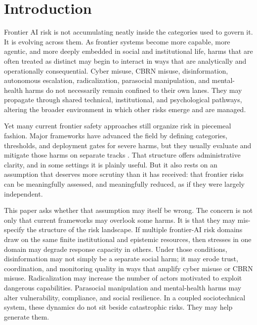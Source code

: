 \documentclass[11pt]{article}
\begin{document}
\section{Introduction}
\label{sec:intro}

Frontier AI risk is not accumulating neatly inside the categories used to govern it. It is evolving across them. As frontier systems become more capable, more agentic, and more deeply embedded in social and institutional life, harms that are often treated as distinct may begin to interact in ways that are analytically and operationally consequential. Cyber misuse, CBRN misuse, disinformation, autonomous escalation, radicalization, parasocial manipulation, and mental-health harms do not necessarily remain confined to their own lanes. They may propagate through shared technical, institutional, and psychological pathways, altering the broader environment in which other risks emerge and are managed.

Yet many current frontier safety approaches still organize risk in piecemeal fashion. Major frameworks have advanced the field by defining categories, thresholds, and deployment gates for severe harms, but they usually evaluate and mitigate those harms on separate tracks \citep{anthropic2024rsp,openai2023preparedness,deepmind2024fsf,nist2023rmf,iaisr2025}. That structure offers administrative clarity, and in some settings it is plainly useful. But it also rests on an assumption that deserves more scrutiny than it has received: that frontier risks can be meaningfully assessed, and meaningfully reduced, as if they were largely independent.

This paper asks whether that assumption may itself be wrong. The concern is not only that current frameworks may overlook some harms. It is that they may mis-specify the structure of the risk landscape. If multiple frontier-AI risk domains draw on the same finite institutional and epistemic resources, then stresses in one domain may degrade response capacity in others. Under those conditions, disinformation may not simply be a separate social harm; it may erode trust, coordination, and monitoring quality in ways that amplify cyber misuse or CBRN misuse. Radicalization may increase the number of actors motivated to exploit dangerous capabilities. Parasocial manipulation and mental-health harms may alter vulnerability, compliance, and social resilience. In a coupled sociotechnical system, these dynamics do not sit beside catastrophic risks. They may help generate them.
\end{document}
